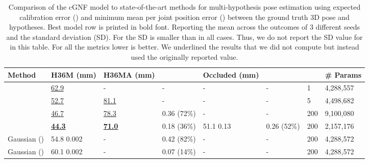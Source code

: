 \documentclass{article} \usepackage{iclr2023_conference,times}
\begin{document}
\begin{table}[h!]
  \def\arraystretch{1.25}
  \caption{Comparison of the cGNF model to state-of-the-art methods for multi-hypothesis pose estimation using expected calibration error () and minimum mean per joint position error () between the ground truth 3D pose and  hypotheses.
  Best model row is printed in bold font.
  Reporting the mean across the outcomes of 3 different seeds and the standard deviation (SD). For  the SD is smaller than  in all cases. Thus, we do not report the SD value for  in this table.
  For all the metrics lower is better. We underlined the results that we did not compute but instead used the originally reported value.\\}
  \label{tab:h36m_results}
  \centering
  \scriptsize
\begin{tabular}{l|lll|ll|ll}
\toprule
Method                                        & H36M \tiny{(mm)}           & H36MA \tiny{(mm)}          &                 & Occluded \tiny{(mm)}                      &                 &                & \# Params \\
\midrule
\citet{martinez_2017_3dbaseline} & \underline{62.9} & - & - &- &- &1&4,288,557\\
\midrule
\citet{Li_Hee_Lee_2019}                            & \underline{52.7}                      & \underline{81.1}                      & -                                & -                                       & -                               & 5                        & 4,498,682 \\
\citet{Sharma_Varigonda_Bindal_Sharma_Jain_2019} & \underline{46.7}                       & \underline{78.3}                       & 0.36 \tiny{(72\%)}                       & -                                       & -                               & 200                      & 9,100,080 \\
\citet{Wehrbein_Rudolph_Rosenhahn_Wandt_2021}     & \underline{\textbf{44.3}}                      & \underline{\textbf{71.0}}                    & 0.18 \tiny{(36\%)}                       & 51.1 \tiny{ 0.13}                     & 0.26 \tiny{(52\%)}                      & 200                      & 2,157,176 \\ 
\midrule
Gaussian ()       & 54.8 \tiny{ 0.002}  & -       & 0.42 \tiny{(82\%)}  & -                  & -          & 200 & 4,288,572 \\
Gaussian ()       & 60.1 \tiny{ 0.002}  & -       & 0.07 \tiny{(14\%)}  & -                  & -          & 200 & 4,288,572 \\

\end{tabular}
\end{table}
\end{document}
